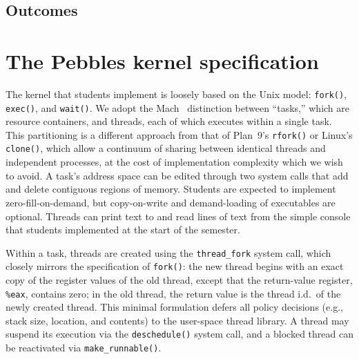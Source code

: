 \subsection{Outcomes}


\section{The Pebbles kernel specification}
\label{sec:pebbles}

The kernel that students implement is loosely based on the
Unix model: \texttt{fork()}, \texttt{exec()}, and \texttt{wait()}.
We adopt the Mach~\cite{DBLP:conf/usenix/AccettaBBGRTY86}
distinction between ``tasks,''
which are resource containers,
and threads,
each of which executes within a single task.
This partitioning is a different approach from that of
Plan~9's \texttt{rfork()} or Linux's \texttt{clone()},
which allow a continuum of sharing between
identical threads and independent processes,
at the cost of implementation complexity which we wish to avoid.
A task's address space can be edited through two system
calls that add and delete contiguous regions of memory.
Students are expected to implement zero-fill-on-demand,
but copy-on-write and demand-loading of executables are
optional.
Threads can print text to and read lines of text from
the simple console that students implemented at
the start of the semester.

Within a task, threads are created using the
\texttt{thread\_fork} system call, which closely
mirrors the specification of \texttt{fork()}:
the new thread begins with an exact copy of the
register values of the old thread, except that
the return-value register, \texttt{\%eax}, contains
zero;
in the old thread, the return value is the thread i.d.\
of the newly created thread.
This minimal formulation defers all policy decisions
(e.g., stack size, location, and contents) to the
user-space thread library.
A thread may suspend its execution via the
\texttt{deschedule()} system call,
and a blocked thread can be reactivated via
\texttt{make\_runnable()}.

